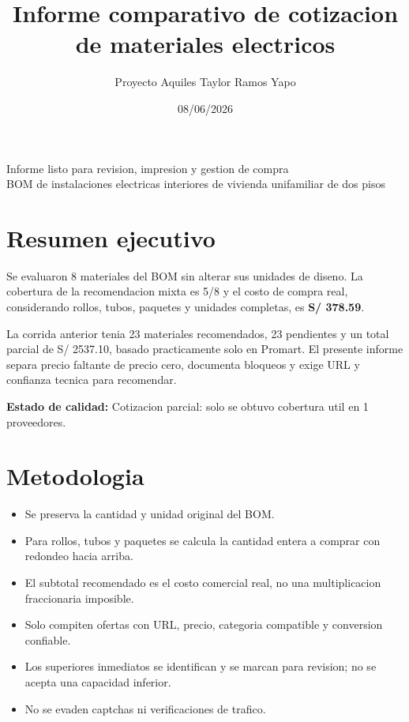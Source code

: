 \documentclass[11pt,a4paper]{article}
\title{Informe comparativo de cotizacion de materiales electricos}
\author{Proyecto Aquiles Taylor Ramos Yapo}
\date{08/06/2026}
\begin{document}
\maketitle
\thispagestyle{empty}
\vfill
\begin{center}
\large Informe listo para revision, impresion y gestion de compra\\[8pt]
\normalsize BOM de instalaciones electricas interiores de vivienda unifamiliar de dos pisos
\end{center}
\vfill
\newpage
\tableofcontents
\newpage

\section{Resumen ejecutivo}
Se evaluaron 8 materiales del BOM sin alterar sus unidades de diseno. La cobertura de la recomendacion mixta es 5/8 y el costo de compra real, considerando rollos, tubos, paquetes y unidades completas, es \textbf{S/ 378.59}.

La corrida anterior tenia 23 materiales recomendados, 23 pendientes y un total parcial de S/ 2537.10, basado practicamente solo en Promart. El presente informe separa precio faltante de precio cero, documenta bloqueos y exige URL y confianza tecnica para recomendar.

\textbf{Estado de calidad:} Cotizacion parcial: solo se obtuvo cobertura util en 1 proveedores.

\section{Metodologia}
\begin{itemize}
\item Se preserva la cantidad y unidad original del BOM.
\item Para rollos, tubos y paquetes se calcula la cantidad entera a comprar con redondeo hacia arriba.
\item El subtotal recomendado es el costo comercial real, no una multiplicacion fraccionaria imposible.
\item Solo compiten ofertas con URL, precio, categoria compatible y conversion confiable.
\item Los superiores inmediatos se identifican y se marcan para revision; no se acepta una capacidad inferior.
\item No se evaden captchas ni verificaciones de trafico.
\end{itemize}
\end{document}

